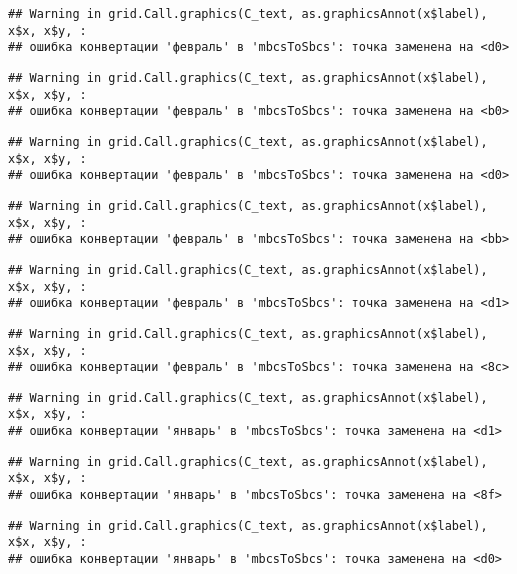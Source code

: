 \documentclass[
]{article}
\begin{document}
\begin{verbatim}
## Warning in grid.Call.graphics(C_text, as.graphicsAnnot(x$label), x$x, x$y, :
## ошибка конвертации 'февраль' в 'mbcsToSbcs': точка заменена на <d0>
\end{verbatim}

\begin{verbatim}
## Warning in grid.Call.graphics(C_text, as.graphicsAnnot(x$label), x$x, x$y, :
## ошибка конвертации 'февраль' в 'mbcsToSbcs': точка заменена на <b0>
\end{verbatim}

\begin{verbatim}
## Warning in grid.Call.graphics(C_text, as.graphicsAnnot(x$label), x$x, x$y, :
## ошибка конвертации 'февраль' в 'mbcsToSbcs': точка заменена на <d0>
\end{verbatim}

\begin{verbatim}
## Warning in grid.Call.graphics(C_text, as.graphicsAnnot(x$label), x$x, x$y, :
## ошибка конвертации 'февраль' в 'mbcsToSbcs': точка заменена на <bb>
\end{verbatim}

\begin{verbatim}
## Warning in grid.Call.graphics(C_text, as.graphicsAnnot(x$label), x$x, x$y, :
## ошибка конвертации 'февраль' в 'mbcsToSbcs': точка заменена на <d1>
\end{verbatim}

\begin{verbatim}
## Warning in grid.Call.graphics(C_text, as.graphicsAnnot(x$label), x$x, x$y, :
## ошибка конвертации 'февраль' в 'mbcsToSbcs': точка заменена на <8c>
\end{verbatim}

\begin{verbatim}
## Warning in grid.Call.graphics(C_text, as.graphicsAnnot(x$label), x$x, x$y, :
## ошибка конвертации 'январь' в 'mbcsToSbcs': точка заменена на <d1>
\end{verbatim}

\begin{verbatim}
## Warning in grid.Call.graphics(C_text, as.graphicsAnnot(x$label), x$x, x$y, :
## ошибка конвертации 'январь' в 'mbcsToSbcs': точка заменена на <8f>
\end{verbatim}

\begin{verbatim}
## Warning in grid.Call.graphics(C_text, as.graphicsAnnot(x$label), x$x, x$y, :
## ошибка конвертации 'январь' в 'mbcsToSbcs': точка заменена на <d0>
\end{verbatim}
\end{document}
